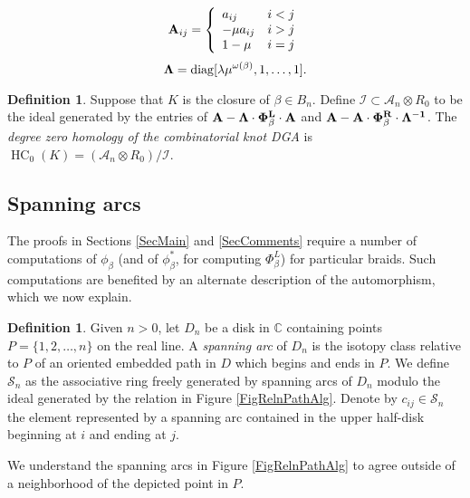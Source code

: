 \documentclass[11pt]{amsart}
\def\C{{\mathbb C}}
\def\A{{\mathcal A}}
\newcommand\diag{\operatorname{diag}}
\theoremstyle{definition}
\newtheorem{defn}[thm]{Definition}
\begin{document}
  \begin{equation}
  {\bf A}_{ij} = 
  \left\{
       \begin{array}{lr}
        a_{ij} & i<j\\
        -\mu a_{ij} & i>j\\
        1-\mu & i = j\\
       \end{array}
  \right.
  \label{def:Amatrix}
  \end{equation}
  \begin{equation}
  {\bf \Lambda} = \diag[\lambda\mu^{\omega(\beta)},1,\ldots,1].
  \label{defn:Lambda}
  \end{equation}

  \begin{defn}
  Suppose that $K$ is the closure of $\beta\in B_n$. Define $\mathcal{I}\subset \A_n\otimes R_0$ to be the ideal generated by the entries of $\bf{A} - \Lambda\cdot\Phi_\beta^L\cdot \bf{A}$ and $\bf{A} - \bf{A}\cdot\Phi_\beta^R\cdot\Lambda^{-1}$. The \emph{degree zero homology of the combinatorial knot DGA} is $\operatorname{HC}_0(K) = (\A_n\otimes R_0)/\mathcal{I}$.
  \label{defn:HC_0}
  \end{defn}
  
\subsection{Spanning arcs}
\label{SecSpanArcs}

  The proofs in Sections \ref{SecMain} and \ref{SecComments} require a number of computations of $\phi_\beta$ (and of $\phi_{\beta}^\ast$, for computing $\Phi_\beta^L$) for particular braids. Such computations are benefited by an alternate description of the automorphism, which we now explain.

  \begin{defn}Given $n>0$, let $D_n$ be a disk in $\C$ containing points $P=\{1,2,\ldots,n\}$ on the real line. A \emph{spanning arc} of $D_n$ is the isotopy class relative to $P$ of an oriented embedded path in $D$ which begins and ends in $P$. We define $\mathscr S_n$ as the associative ring freely generated by spanning arcs of $D_n$ modulo the ideal generated by the relation in Figure \ref{FigRelnPathAlg}. Denote by $c_{ij}\in\mathscr S_n$ the element represented by a spanning arc contained in the upper half-disk beginning at $i$ and ending at $j$.
  \label{DefnSpanningArcAlg}
  \end{defn}
  We understand the spanning arcs in Figure \ref{FigRelnPathAlg} to agree outside of a neighborhood of the depicted point in $P$.
\end{document}
